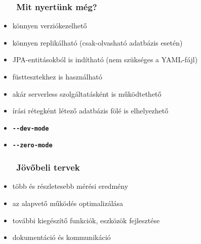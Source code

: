 \documentclass[
    aspectratio=169,
]{beamer}
\newcommand{\slidetitle}[2]{\frametitle{{\small #1 ~ \ding{226} ~ } \normalsize \textbf{#2} }}
\begin{document}
\begin{frame}
    \slidetitle{\sectionshorttitle}{Mit nyertünk még?}
    
    \begin{itemize}
        \setlength\itemsep{1em}
        \item könnyen verziókezelhető
        \item könnyen replikálható (csak-olvasható adatbázis esetén)
        \item JPA-entitásokból is indítható (nem szükséges a YAML-fájl)
        \item füsttesztekhez is használható
        \item akár serverless szolgáltatásként is működtethető
        \item írási rétegként létező adatbázis fölé is elhelyezhető
        \pause \item \textbf{\large\texttt{{-}{-}dev{-}mode}}
        \pause \item \textbf{\large\texttt{{-}{-}zero{-}mode}}
    \end{itemize}
\end{frame}

\begin{frame}
    \slidetitle{\sectionshorttitle}{Jövőbeli tervek}

    \begin{itemize}
        \setlength\itemsep{1em}
        \item {\color{red}több és részletesebb mérési eredmény}
        \item az alapvető működés optimalizálása
        \item további kiegészítő funkciók, eszközök fejlesztése
        \item dokumentáció és kommunikáció
    \end{itemize}
\end{frame}
        
\end{document}
